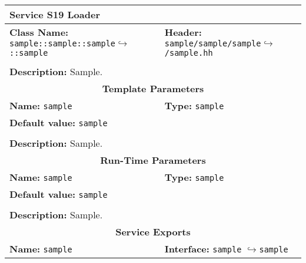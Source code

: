 \newpage
\begin{center}
	\begin{tabular}{|p{7.5cm}|p{7.5cm}|}
		\hline
		\multicolumn{2}{|l|}{\textbf{\Large Service S19 Loader}}\\
		\hline
		\multicolumn{1}{|p{7.5cm}}{\textbf{Class Name:} \newline \texttt{sample::sample::sample}\newline$\hookrightarrow$\texttt{::sample}} & \multicolumn{1}{p{7.5cm}|}{\textbf{Header:} \newline \texttt{sample/sample/sample}\newline$\hookrightarrow$\texttt{/sample.hh}}\\
		\multicolumn{2}{|l|}{}\\
		\multicolumn{2}{|p{15cm}|}{\textbf{Description:} \newline Sample.}\\
		\hline
		\hline
		\multicolumn{2}{|c|}{\textbf{\large Template Parameters}}\\
		\hline
		\multicolumn{1}{|p{7.5cm}}{\textbf{Name:} \texttt{sample}} & \multicolumn{1}{p{7.5cm}|}{\textbf{Type:} \texttt{sample}}\\
		\multicolumn{2}{|p{15cm}|}{\textbf{Default value:} \texttt{sample}}\\
		\multicolumn{2}{|l|}{}\\
		\multicolumn{2}{|p{15cm}|}{\textbf{Description:} \newline Sample.}\\
		\hline
		\hline
		\multicolumn{2}{|c|}{\textbf{\large Run-Time Parameters}}\\
		\hline
		\multicolumn{1}{|p{7.5cm}}{\textbf{Name:} \texttt{sample}} & \multicolumn{1}{p{7.5cm}|}{\textbf{Type:} \texttt{sample}}\\
		\multicolumn{2}{|p{15cm}|}{\textbf{Default value:} \texttt{sample}}\\
		\multicolumn{2}{|l|}{}\\
		\multicolumn{2}{|p{15cm}|}{\textbf{Description:} \newline Sample.}\\
		\hline
		\hline
		\multicolumn{2}{|c|}{\textbf{\large Service Exports}}\\
		\hline
		\multicolumn{1}{|p{7.5cm}}{\textbf{Name:} \texttt{sample}} & \multicolumn{1}{p{7.5cm}|}{\textbf{Interface:} \newline \texttt{sample} \newline$\hookrightarrow$\texttt{sample}}\\

\end{tabular}
\end{center}
